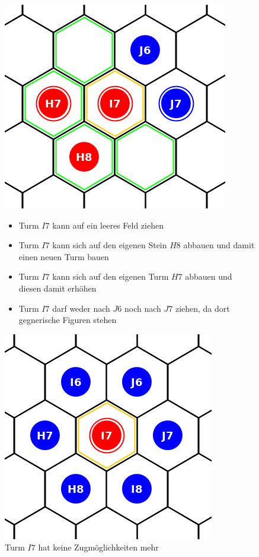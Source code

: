\begin{figure}[ht]
\begin{center}
\includegraphics[scale=0.3]{graphic/tower-move.png}
\end{center}
\begin{itemize}
\item Turm $I7$ kann auf ein leeres Feld ziehen
\item Turm $I7$ kann sich auf den eigenen Stein $H8$ abbauen und damit einen neuen Turm bauen
\item Turm $I7$ kann sich auf den eigenen Turm $H7$ abbauen und diesen damit erhöhen
\item Turm $I7$ darf weder nach $J6$ noch nach $J7$ ziehen, da dort gegnerische Figuren stehen
\end{itemize}
\end{figure}

\begin{figure}[ht]
\begin{center}
\includegraphics[scale=0.3]{graphic/neighbor-blocked-tower.png}
\end{center}
\caption*{Turm $I7$ hat keine Zugmöglichkeiten mehr}
\end{figure}


